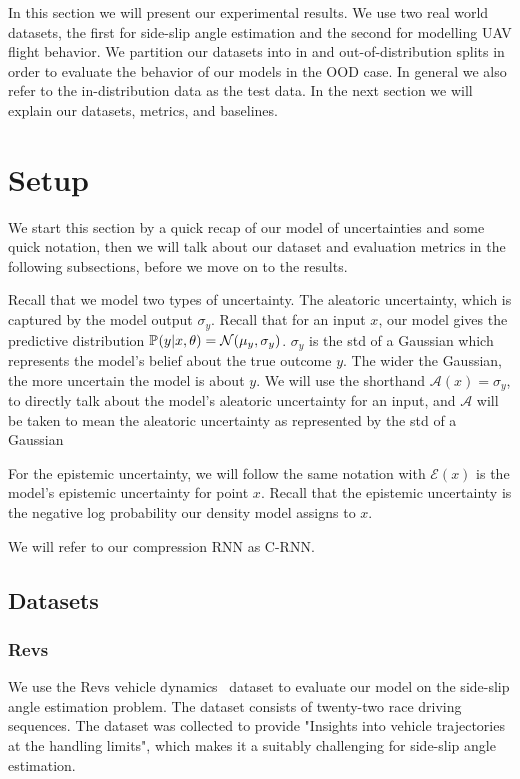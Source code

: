 \documentclass[../main.tex]{subfiles}
\begin{document}
{}

In this section we will present our experimental results. We use two real world datasets, the first for side-slip angle estimation and the second for modelling UAV flight behavior.
We partition our datasets into in and out-of-distribution splits in order to evaluate the behavior of our models in the OOD case. In general we also refer to the in-distribution data as the test data.  
In the next section we will explain our datasets, metrics, and baselines. 

\section{Setup}

We start this section by a quick recap of our model of uncertainties and some quick notation, then we will talk about our dataset and evaluation metrics in the following subsections, before we move on to the results.

Recall that we model two types of uncertainty. The aleatoric uncertainty, which is captured by the model output $\sigma_y$. Recall that for an input $x$, our model gives the predictive distribution $\mathbb{P}_{}(y|x, \theta) = \mathcal{N}(\mu_y, \sigma_y)$. 
$\sigma_y$ is the std of a Gaussian which represents the model's belief about the true outcome $y$. The wider the Gaussian, the more uncertain the model is about $y$. We will use the shorthand $\mathcal{A}(x) = \sigma_y$, to directly talk about the model's aleatoric uncertainty for an input, and $\mathcal{A}$ will be taken to mean the aleatoric uncertainty as represented by the std of a Gaussian

For the epistemic uncertainty, we will follow the same notation with $\mathcal{E}(x)$ is the model's epistemic uncertainty for point $x$. Recall that the epistemic uncertainty is the negative log probability our density model assigns to $x$. 

We will refer to our compression RNN as C-RNN. 

\subsection{Datasets}
\subsubsection{Revs}
We use the Revs vehicle dynamics~\citep{doi:10.1080/00423114.2016.1249893} dataset to evaluate our model on the side-slip angle estimation problem. The dataset consists of twenty-two race driving sequences. The dataset was collected to provide "Insights into vehicle trajectories at the handling limits", which makes it a suitably challenging for side-slip angle estimation. 
\end{document}
